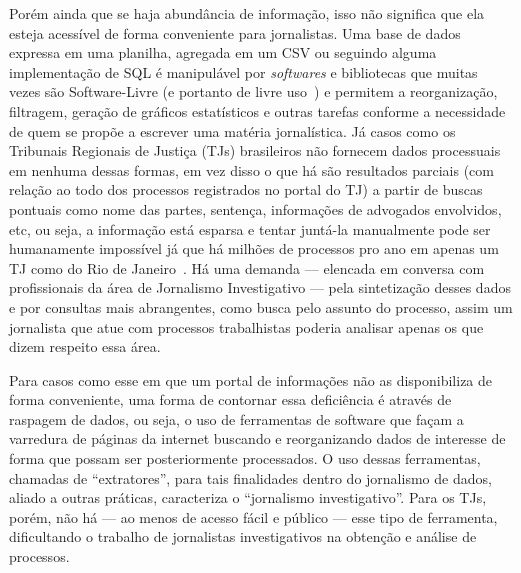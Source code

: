 Porém ainda que se haja abundância de informação, isso não significa que ela
esteja acessível de forma conveniente para jornalistas. Uma base de dados
expressa em uma planilha, agregada em um CSV ou seguindo alguma implementação
de SQL é manipulável por \textit{softwares} e bibliotecas que muitas vezes são
Software-Livre (e portanto de livre uso~\cite{def:free-software}) e permitem a
reorganização, filtragem, geração de gráficos estatísticos e outras tarefas
conforme a necessidade de quem se propõe a escrever uma matéria jornalística.
Já casos como os Tribunais Regionais de Justiça (TJs) brasileiros não fornecem
dados processuais em nenhuma dessas formas, em vez disso o que há são
resultados parciais (com relação ao todo dos processos registrados no portal do
TJ) a partir de buscas pontuais como nome das partes, sentença, informações de
advogados envolvidos, etc, ou seja, a informação está esparsa e tentar juntá-la
manualmente pode ser humanamente impossível já que há milhões de processos pro
ano em apenas um TJ como do Rio de Janeiro~\cite{tjrj}. Há uma demanda ---
elencada em conversa com profissionais da área de Jornalismo Investigativo ---
pela sintetização desses dados e por consultas mais abrangentes, como busca
pelo assunto do processo, assim um jornalista que atue com processos
trabalhistas poderia analisar apenas os que dizem respeito essa área.

Para casos como esse em que um portal de informações não as disponibiliza de
forma conveniente, uma forma de contornar essa deficiência é através de
raspagem de dados, ou seja, o uso de ferramentas de software que façam a
varredura de páginas da internet buscando e reorganizando dados de interesse de
forma que possam ser posteriormente processados. O uso dessas ferramentas,
chamadas de ``extratores'', para tais finalidades dentro do jornalismo de
dados, aliado a outras práticas, caracteriza o ``jornalismo investigativo''.
Para os TJs, porém, não há --- ao menos de acesso fácil e público --- esse tipo
de ferramenta, dificultando o trabalho de jornalistas investigativos na
obtenção e análise de processos.
